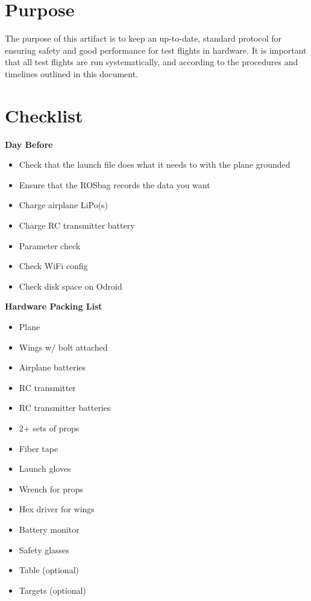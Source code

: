 \documentclass[]{auvsi_doc}
\begin{document}
\begin{AUVSITitlePage}
\begin{artifacttable}
\end{artifacttable}
\end{AUVSITitlePage}

\section{Purpose}

The purpose of this artifact is to keep an up-to-date, standard protocol for ensuring safety and good performance for test flights in hardware. It is important that all test flights are run systematically, and according to the procedures and timelines outlined in this document.

\section{Checklist}

\textbf{Day Before}
\begin{itemize}
	\item Check that the launch file does what it needs to with the plane grounded
	\item Ensure that the ROSbag records the data you want
	\item Charge airplane LiPo(s)
	\item Charge RC transmitter battery
	\item Parameter check
	\item Check WiFi config
	\item Check disk space on Odroid
\end{itemize}

\hrulefill

\textbf{Hardware Packing List}
\begin{itemize}
	\item Plane
	\item Wings w/ bolt attached
	\item Airplane batteries
	\item RC transmitter
	\item RC transmitter batteries
	\item 2+ sets of props
	\item Fiber tape
	\item Launch gloves
	\item Wrench for props
	\item Hex driver for wings
	\item Battery monitor
	\item Safety glasses
	\item Table (optional)
	\item Targets (optional)
\end{itemize}
\end{document}
